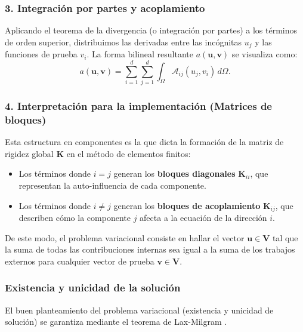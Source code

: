 \documentclass[12pt, letterpaper]{report}
\theoremstyle{definition}
\begin{document}
\subsubsection*{3. Integración por partes y acoplamiento}
Aplicando el teorema de la divergencia (o integración por partes) a los términos de orden superior, distribuimos las derivadas entre las incógnitas $u_j$ y las funciones de prueba $v_i$. La forma bilineal resultante $a(\mathbf{u}, \mathbf{v})$ se visualiza como:
\begin{equation}
    a(\mathbf{u}, \mathbf{v}) = \sum_{i=1}^d \sum_{j=1}^d \int_{\Omega} \mathcal{A}_{ij}(u_j, v_i) \, d\Omega.
\end{equation}

\subsubsection*{4. Interpretación para la implementación (Matrices de bloques)}
Esta estructura en componentes es la que dicta la formación de la matriz de rigidez global $\mathbf{K}$ en el método de elementos finitos:
\begin{itemize}
    \item Los términos donde $i=j$ generan los \textbf{bloques diagonales} $\mathbf{K}_{ii}$, que representan la auto-influencia de cada componente.
    \item Los términos donde $i \neq j$ generan los \textbf{bloques de acoplamiento} $\mathbf{K}_{ij}$, que describen cómo la componente $j$ afecta a la ecuación de la dirección $i$.
\end{itemize}

De este modo, el problema variacional consiste en hallar el vector $\mathbf{u} \in \mathbf{V}$ tal que la suma de todas las contribuciones internas sea igual a la suma de los trabajos externos para cualquier vector de prueba $\mathbf{v} \in \mathbf{V}$.

\subsubsection{Existencia y unicidad de la solución}

El buen planteamiento del problema variacional (existencia y unicidad de solución) se garantiza mediante el teorema de Lax-Milgram \cite{ciarlet2002finite}.
\end{document}
